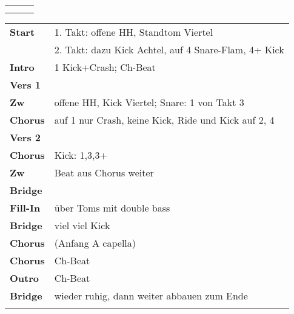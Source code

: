 

\begin{tabular}{p{0.6cm}p{12cm}p{1.4cm}}
	\rowcolor{cyan} \myRow{\thesongnumber} & \myRow{Priorität} & \myRow{160} \\
	                                       &                   &             \\
\end{tabular}

\begin{tabular}{p{1.6cm}l}
	\textbf{Start}   & 1. Takt: offene HH, Standtom Viertel                 \\
	                 & 2. Takt: dazu Kick Achtel, auf 4 Snare-Flam, 4+ Kick \\
	\textbf{Intro}   & 1 Kick+Crash; Ch-Beat                                \\
	\textbf{Vers 1}  &                                                      \\
	\textbf{Zw}      & offene HH, Kick Viertel; Snare: 1 von Takt 3         \\
	\textbf{Chorus}  & auf 1 nur Crash, keine Kick, Ride und Kick auf 2, 4  \\
	\textbf{Vers 2}  &                                                      \\
	\textbf{Chorus}  & Kick: 1,3,3+                                         \\
	\textbf{Zw}      & Beat aus Chorus weiter                               \\
	\textbf{Bridge}  &                                                      \\
	\textbf{Fill-In} & \sechzehntel über Toms mit double bass               \\
	\textbf{Bridge}  & viel viel Kick                                       \\
	\textbf{Chorus}  & (Anfang A capella)                                   \\
	\textbf{Chorus}  & Ch-Beat                                              \\
	\textbf{Outro}   & Ch-Beat                                              \\
	\textbf{Bridge}  & wieder ruhig, dann weiter abbauen zum Ende           \\
	                 &                                                      \\
\end{tabular}

